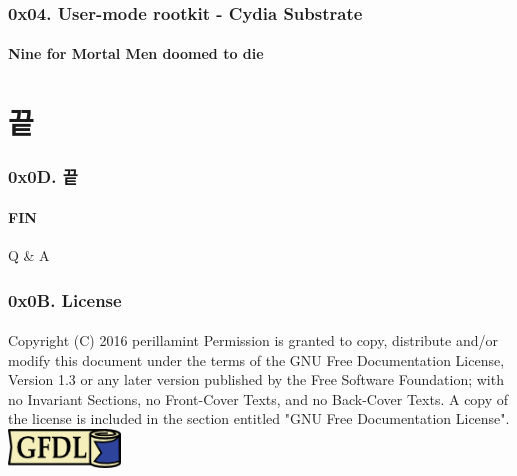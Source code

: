 \begin{frame}
  \frametitle{0x04. User-mode rootkit - Cydia Substrate}
  \framesubtitle{Nine for Mortal Men doomed to die}

\end{frame}

\section[Section]{끝}
\begin{frame}
  \frametitle{0x0D. 끝}
  \framesubtitle{FIN}

  \begin{center}
    Q \& A
  \end{center}
\end{frame}

\begin{frame}
  \frametitle{0x0B. License}
  \framesubtitle{}
  Copyright (C)  2016 perillamint\linebreak
  Permission is granted to copy, distribute and/or modify this document
  under the terms of the GNU Free Documentation License, Version 1.3
  or any later version published by the Free Software Foundation;\linebreak
  with no Invariant Sections, no Front-Cover Texts, and no Back-Cover Texts.
  A copy of the license is included in the section entitled "GNU
  Free Documentation License".
  \linebreak
  \linebreak
  \linebreak
  \linebreak
  \includegraphics [width=30mm]{img/gfdl-logo-small.png}
\end{frame}


